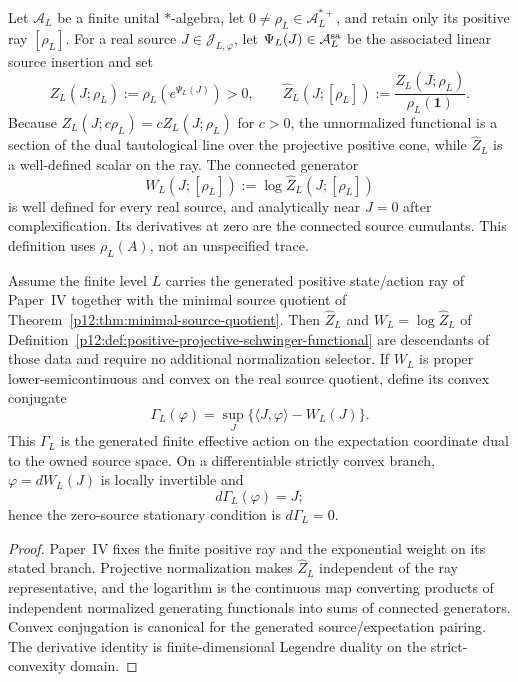 \documentclass[12pt,a4paper]{article}
\begin{document}
\begin{definition}
\label{p12:def:positive-projective-schwinger-functional}
Let \(\mathcal A_L\) be a finite unital \(*\)-algebra, let
\(0\ne\rho_L\in\mathcal A_L^{*+}\), and retain only its positive ray
\([\rho_L]\).  For a real source
\(J\in\mathcal J_{L,\varphi}\), let
\(\Psi_L(J)\in\mathcal A_L^{\rm sa}\) be the associated linear source
insertion and set
\[
 Z_L(J;\rho_L):=\rho_L\!\left(e^{\Psi_L(J)}\right)>0,
 \qquad
 \widehat Z_L(J;[\rho_L])
 :=\frac{Z_L(J;\rho_L)}{\rho_L(\mathbf1)}.
\]
Because \(Z_L(J;c\rho_L)=cZ_L(J;\rho_L)\) for \(c>0\), the unnormalized
functional is a section of the dual tautological line over the projective
positive cone, while \(\widehat Z_L\) is a well-defined scalar on the ray.
The connected generator
\[
 W_L(J;[\rho_L]):=\log\widehat Z_L(J;[\rho_L])
\]
is well defined for every real source, and analytically near \(J=0\) after
complexification.  Its derivatives at zero are the connected source
cumulants.  This definition uses \(\rho_L(A)\), not an unspecified trace.
\end{definition}

\begin{theorem}
\label{p12:thm:generated-schwinger-effective-action-closure}
Assume the finite level $L$ carries the generated positive state/action ray of
Paper~IV together with the minimal source quotient of
Theorem~\ref{p12:thm:minimal-source-quotient}.  Then
$\widehat Z_L$ and $W_L=\log\widehat Z_L$ of
Definition~\ref{p12:def:positive-projective-schwinger-functional} are
descendants of those data and require no additional normalization selector.
If $W_L$ is proper lower-semicontinuous and convex on the real source quotient,
define its convex conjugate
\[
 \boxed{
 \Gamma_L(\varphi)
 =\sup_J\{\langle J,\varphi\rangle-W_L(J)\}.}
\]
This $\Gamma_L$ is the generated finite effective action on the expectation
coordinate dual to the owned source space.  On a differentiable strictly
convex branch, $\varphi=dW_L(J)$ is locally invertible and
\[
 d\Gamma_L(\varphi)=J;
\]
hence the zero-source stationary condition is $d\Gamma_L=0$.
\end{theorem}

\begin{proof}
Paper~IV fixes the finite positive ray and the exponential weight on its stated
branch.  Projective normalization makes $\widehat Z_L$ independent of the ray
representative, and the logarithm is the continuous map converting products of
independent normalized generating functionals into sums of connected
generators.  Convex conjugation is canonical for the generated source/expectation
pairing.  The derivative identity is finite-dimensional Legendre duality on
the strict-convexity domain.
\end{proof}
\end{document}
